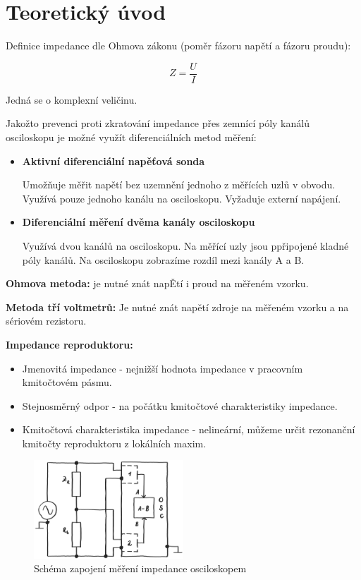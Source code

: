 \documentclass[a4paper, czech]{article}
\begin{document}
\section{Teoretický úvod}

Definice impedance dle Ohmova zákonu (poměr fázoru napětí a fázoru proudu):

\begin{equation*}
    Z = \frac{U}{I}
\end{equation*}

Jedná se o komplexní veličinu.

Jakožto prevenci proti zkratování impedance přes zemnící póly kanálů osciloskopu je možné využít diferenciálních metod měření:

\begin{itemize}
    \item \textbf{Aktivní diferenciální napěťová sonda}
    
    Umožňuje měřit napětí bez uzemnění jednoho z měřících uzlů v obvodu.
    Využívá pouze jednoho kanálu na osciloskopu.
    Vyžaduje externí napájení.
    \item \textbf{Diferenciální měření dvěma kanály osciloskopu}
    
    Využívá dvou kanálů na osciloskopu.
    Na měřící uzly jsou ppřipojené kladné póly kanálů.
    Na osciloskopu zobrazíme rozdíl mezi kanály A a B.
\end{itemize}

\textbf{Ohmova metoda:} je nutné znát napĚtí i proud na měřeném vzorku.

\textbf{Metoda tří voltmetrů:} Je nutné znát napětí zdroje na měřeném vzorku a na sériovém rezistoru.

\textbf{Impedance reproduktoru:}

\begin{itemize}
    \item Jmenovitá impedance - nejnižší hodnota impedance v pracovním kmitočtovém pásmu.
    \item Stejnosměrný odpor - na počátku kmitočtové charakteristiky impedance.
    \item Kmitočtová charakteristika impedance - nelineární, můžeme určit rezonanční kmitočty reproduktoru z lokálních maxim.
\end{itemize}

\begin{figure}[H]
    \centering
    \includegraphics[width = 0.5\textwidth]{schema3b.png}
    \caption{Schéma zapojení měření impedance osciloskopem}
\end{figure}
\end{document}
